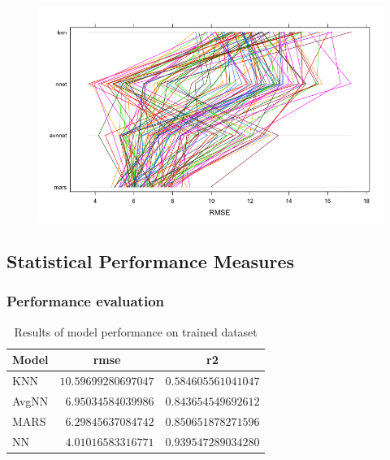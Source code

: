 \documentclass[letterpaper,12pt,titlepage,oneside,final]{report}
\begin{document}
                \begin{figure}[!h]
                    \centering
                    \includegraphics[width=\textwidth]{resamp_parallelplot}
                    \caption{}
                    \label{resamp_parallelplot}
                \end{figure}
                \clearpage

        \subsection{Statistical Performance Measures}

            \subsubsection {Performance evaluation}
                \begin{table}[!hp]
                    \begin{center}
                    \begin{tabular}{lrr}
                    \hline\hline
                    \multicolumn{1}{l}{Model}&\multicolumn{1}{c}{rmse}&\multicolumn{1}{c}{r2}\tabularnewline
                    \hline
                    KNN&$10.59699280697047$&$0.584605561041047$\tabularnewline
                    AvgNN&$ 6.95034584039986$&$0.843654549692612$\tabularnewline
                    MARS&$ 6.29845637084742$&$0.850651878271596$\tabularnewline
                    NN&$ 4.01016583316771$&$0.939547289034280$\tabularnewline
                    \hline
                    \end{tabular}
                    \caption{Results of model performance on trained dataset}
                    \label{test-res}
                    \end{center}

                \end{table}
\end{document}
